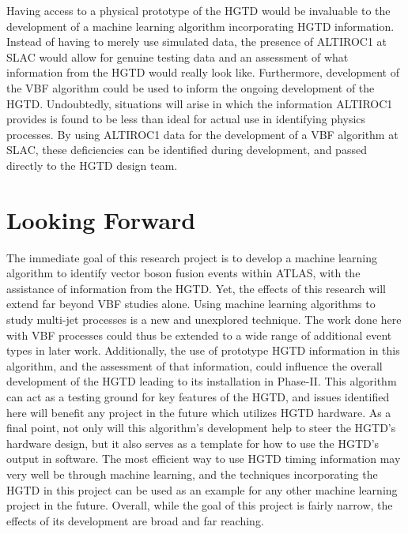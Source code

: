 \documentclass[12pt,letterpaper]{article}
\begin{document}
    Having access to a physical prototype of the HGTD would be invaluable to the development of a machine learning algorithm incorporating HGTD information. Instead of having to merely use simulated data, the presence of ALTIROC1 at SLAC would allow for genuine testing data and an assessment of what information from the HGTD would really look like. Furthermore, development of the VBF algorithm could be used to inform the ongoing development of the HGTD. Undoubtedly, situations will arise in which the information ALTIROC1 provides is found to be less than ideal for actual use in identifying physics processes. By using ALTIROC1 data for the development of a VBF algorithm at SLAC, these deficiencies can be identified during development, and passed directly to the HGTD design team.



\section*{Looking Forward}
    The immediate goal of this research project is to develop a machine learning algorithm to identify vector boson fusion events within ATLAS, with the assistance of information from the HGTD. Yet, the effects of this research will extend far beyond VBF studies alone. Using machine learning algorithms to study multi-jet processes is a new and unexplored technique. The work done here with VBF processes could thus be extended to a wide range of additional event types in later work. Additionally, the use of prototype HGTD information in this algorithm, and the assessment of that information, could influence the overall development of the HGTD leading to its installation in Phase-II. This algorithm can act as a testing ground for key features of the HGTD, and issues identified here will benefit any project in the future which utilizes HGTD hardware. As a final point, not only will this algorithm's development help to steer the HGTD's hardware design, but it also serves as a template for how to use the HGTD's output in software. The most efficient way to use HGTD timing information may very well be through machine learning, and the techniques incorporating the HGTD in this project can be used as an example for any other machine learning project in the future. Overall, while the goal of this project is fairly narrow, the effects of its development are broad and far reaching.




\newpage
\begin{appendix}
\end{appendix}





\end{document}
